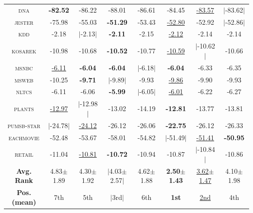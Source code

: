 \documentclass[14pt]{ffslides}
\newenvironment{vhcenterb}{\vspace*{\fill}\begin{center}}{\end{center}\vspace*{\fill}}
\begin{document}
\begin{vhcenterb}
{\begin{tabular}{c|ccccc|cc}
    \textsc{dna       } & \textbf{-82.52} & -86.22 & -88.01 & -86.61 & -84.45 & \underline{-83.57} & $|$-83.62$|$\\
    \textsc{jester    } & -75.98 & -55.03 & \textbf{-51.29} & -53.43 & \underline{-52.80} & -52.92 & $|$-52.86$|$\\
    \textsc{kdd       } & -2.18 & $|$-2.13$|$ & \textbf{-2.11} & -2.15 & \underline{-2.12} & -2.14 & -2.14\\
    \textsc{kosarek   } & -10.98 & -10.68 & \textbf{-10.52} & -10.77 & \underline{-10.59} & $|$-10.62$|$ & -10.66\\
    \textsc{msnbc     } & \underline{-6.11} & \textbf{-6.04} & \textbf{-6.04} & $|$-6.18$|$ & \textbf{-6.04} & -6.33 & -6.35\\
    \textsc{msweb     } & -10.25 & \textbf{-9.71} & $|$-9.89$|$ & -9.93 & \underline{-9.86} & -9.90 & -9.93\\
    \textsc{nltcs     } & -6.11 & -6.06 & \textbf{-5.99} & $|$-6.05$|$ & \underline{-6.01} & -6.22 & -6.27\\
    \textsc{plants    } & \underline{-12.97} & $|$-12.98$|$ & -13.02 & -14.19 & \textbf{-12.81} & -13.77 & -13.81\\
    \textsc{pumsb-star} & $|$-24.78$|$ & \underline{-24.12} & -26.12 & -26.06 & \textbf{-22.75} & -26.12 & -26.33\\
    \textsc{eachmovie } & -52.48 & -53.67 & -58.01 & -54.82 & $|$-51.49$|$ & \underline{-51.41} & \textbf{-50.95}\\
    \textsc{retail    } & -11.04 & \underline{-10.81} & \textbf{-10.72} & -10.94 & -10.87 & $|$-10.84$|$ & -10.86\\
    \hline
    \textbf{Avg. Rank} & 4.83$\pm$ 1.89 & 4.30$\pm$ 1.92 & $|$4.03$\pm$ 2.57$|$ & 4.62$\pm$ 1.88 & \textbf{2.50$\pm$ 1.43} & \underline{3.62$\pm$ 1.47} & 4.10$\pm$ 1.98 \\
    \hline
    \textbf{Pos. (mean)} & 7th & 5th & $|$3rd$|$ & 6th & \textbf{1st} & \underline{2nd} & 4th \\
    \hline
  \end{tabular}
  }
\end{vhcenterb}

{\color{boxdgray}\cite{gens13,dang20,liang17,dimauro21,jaini18a}}

\end{document}
